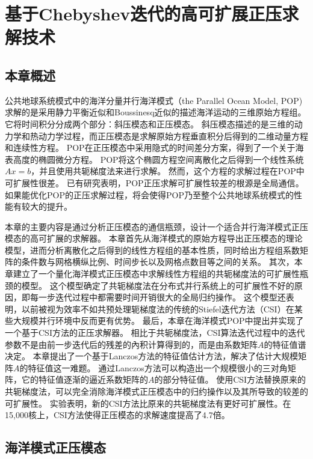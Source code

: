 \chapter{基于Chebyshev迭代的高可扩展正压求解技术}
\label{cha:barosSolver}

\section{本章概述}

公共地球系统模式中的海洋分量并行海洋模式（the Parallel Ocean Model, POP) 求解的是采用静力平衡近似和Boussinesq近似的描述海洋运动的三维原始方程组。 
它将时间积分分成两个部分：斜压模态和正压模态。 
斜压模态描述的是三维的动力学和热动力学过程，而正压模态是求解原始方程垂直积分后得到的二维动量方程和连续性方程。
POP在正压模态中采用隐式的时间差分方案，得到了一个关于海表高度的椭圆微分方程。 
POP将这个椭圆方程空间离散化之后得到一个线性系统$Ax=b$，并且使用共轭梯度法来进行求解。
然而，这个方程的求解过程在POP中可扩展性很差。
已有研究表明，POP正压求解可扩展性较差的根源是全局通信\cite{Worley:2011:PCE:2063384.2063457}。 
如果能优化POP的正压求解过程，将会使得POP乃至整个公共地球系统模式的性能有较大的提升\cite{dennis2012computational}。 


本章的主要内容是通过分析正压模态的通信瓶颈，设计一个适合并行海洋模式正压模态的高可扩展的求解器。 
本章首先从海洋模式的原始方程导出正压模态的理论模型，进而分析离散化之后得到的线性方程组的基本性质，同时给出方程组系数矩阵的条件数与网格横纵比例、时间步长以及网格点数目等之间的关系。 
其次，本章建立了一个量化海洋模式正压模态中求解线性方程组的共轭梯度法的可扩展性瓶颈的模型。
这个模型确定了共轭梯度法在分布式并行系统上的可扩展性不好的原因，即每一步迭代过程中都需要时间开销很大的全局归约操作。 这个模型还表明，以前被视为效率不如共预处理轭梯度法的传统的Stiefel迭代方法（CSI）在某些大规模并行环境中反而更有优势。
最后，本章在海洋模式POP中提出并实现了一个基于CSI方法的正压求解器。 相比于共轭梯度法，CSI算法迭代过程中的迭代参数不是由前一步迭代后的残差的內积计算得到的，而是由系数矩阵$A$的特征值谱决定。 
本章提出了一个基于Lanczos方法的特征值估计方法，解决了估计大规模矩阵$A$的特征值这一难题。 
通过Lanczos方法可以构造出一个规模很小的三对角矩阵，它的特征值逐渐的逼近系数矩阵的$A$的部分特征值。 
使用CSI方法替换原来的共轭梯度法，可以完全消除海洋模式正压模态中的归约操作以及其所导致的较差的可扩展性。 
实验表明，新的CSI方法比原来的共轭梯度法有更好可扩展性。在15,000核上，CSI方法使得正压模态的求解速度提高了4.7倍。





\section{海洋模式正压模态}
\label{solver:baro}

